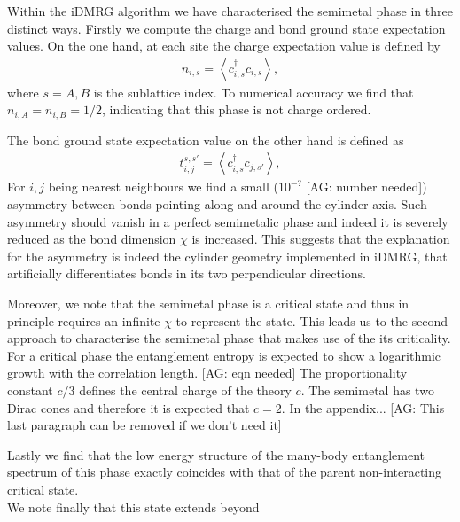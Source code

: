\documentclass[aps,prx,10pt,twocolumn,floatfix,superscriptaddress,showpacs,numerical,footinbib]{revtex4-1}
\newcommand{\noteAG}[1]{{\color{blue} [AG: #1]}}
\begin{document}
Within the iDMRG algorithm we have characterised the semimetal phase in three distinct ways.
%
Firstly we compute the charge and bond ground state expectation values.
%
On the one hand, at each site the charge expectation value is defined by 
%
\begin{eqnarray}
\label{eq:charge}
n_{i,s}=\left\langle c^{\dagger}_{i,s}c_{i,s}\right\rangle,  
\end{eqnarray}
%
where $s=A,B$ is the sublattice index.
%
To numerical accuracy we find that $n_{i,A}=n_{i,B}=1/2$, indicating that this phase is not charge ordered.
%

The bond ground state expectation value on the other hand is defined as
%
\begin{eqnarray}
\label{eq:bond}
t^{s,s'}_{i,j}=\left\langle c^{\dagger}_{i,s}c_{j,s'}\right\rangle,  
\end{eqnarray}
%
For $i,j$ being nearest neighbours we find a small ($10^{-?}$ \noteAG{number needed}) asymmetry
between bonds pointing along and around the cylinder axis.
%
Such asymmetry should vanish in a perfect semimetalic phase and indeed it is severely reduced as the bond dimension $\chi$ is increased.
% 
This suggests that the explanation for the asymmetry is indeed the cylinder geometry implemented in iDMRG, that artificially differentiates bonds in its two perpendicular directions.
%

%
Moreover, we note that the semimetal phase is a critical state and thus in principle requires an infinite $\chi$ to represent the state.
%
This leads us to the second approach to characterise the semimetal phase that makes use of the its criticality.
%
For a critical phase the entanglement entropy is expected to show a logarithmic growth with the correlation length.
\noteAG{eqn needed}
%
The proportionality constant $c/3$ defines the central charge of the theory $c$. 
%
The semimetal has two Dirac cones and therefore it is expected that $c=2$. 
%
In the appendix...
\noteAG{This last paragraph can be removed if we don't need it}

%
Lastly we find that the low energy structure of the many-body 
entanglement spectrum of this phase exactly coincides with that of the parent non-interacting critical state.\\ 
%

%
We note finally that this state extends beyond 
\end{document}
